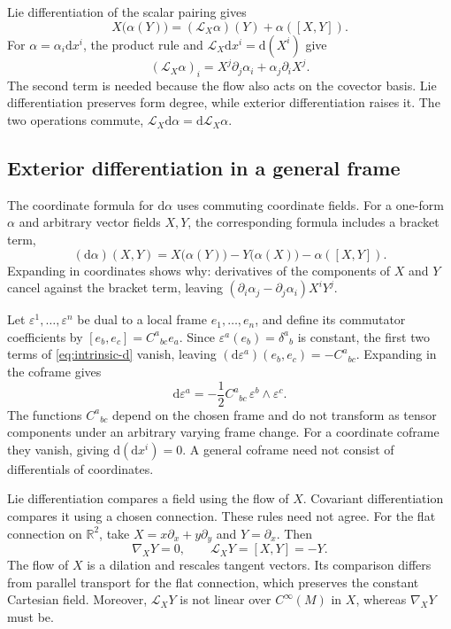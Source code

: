 \documentclass[11pt,a4paper]{article}
\numberwithin{equation}{section}
\newcommand{\R}{\mathbb R}
\newcommand{\dd}{\mathrm d}
\newcommand{\Cinf}{C^\infty}
\newcommand{\Lie}{\mathcal L}
\begin{document}
Lie differentiation of the scalar pairing gives
\[
 X\bigl(\alpha(Y)\bigr)=(\Lie_X\alpha)(Y)+\alpha([X,Y]).
\]
For \(\alpha=\alpha_i\dd x^i\), the product rule and
\(\Lie_X\dd x^i=\dd(X^i)\) give
\begin{equation}
 (\Lie_X\alpha)_i=X^j\partial_j\alpha_i+\alpha_j\partial_iX^j.
 \label{eq:lie-one-form}
\end{equation}
The second term is needed because the flow also acts on the covector
basis. Lie differentiation preserves form degree, while exterior
differentiation raises it. The two operations commute,
\(\Lie_X\dd\alpha=\dd\Lie_X\alpha\).

\subsection{Exterior differentiation in a general frame}

The coordinate formula for \(\dd\alpha\) uses commuting coordinate
fields. For a one-form \(\alpha\) and arbitrary vector fields \(X,Y\),
the corresponding formula includes a bracket term,
\begin{equation}
 (\dd\alpha)(X,Y)
 =X\bigl(\alpha(Y)\bigr)-Y\bigl(\alpha(X)\bigr)-\alpha([X,Y]).
 \label{eq:intrinsic-d}
\end{equation}
Expanding in coordinates shows why: derivatives of the components of
\(X\) and \(Y\) cancel against the bracket term, leaving
\((\partial_i\alpha_j-\partial_j\alpha_i)X^iY^j\).

Let \(\varepsilon^1,\ldots,\varepsilon^n\) be dual to a local frame
\(e_1,\ldots,e_n\), and define its commutator coefficients by
\([e_b,e_c]=C^a{}_{bc}e_a\). Since
\(\varepsilon^a(e_b)=\delta^a{}_b\) is constant, the first two
terms of \eqref{eq:intrinsic-d} vanish, leaving
\((\dd\varepsilon^a)(e_b,e_c)=-C^a{}_{bc}\). Expanding in the coframe
gives
\begin{equation}
 \dd\varepsilon^a=-\frac12 C^a{}_{bc}\,
                         \varepsilon^b\wedge\varepsilon^c.
 \label{eq:coframe-bracket}
\end{equation}
The functions \(C^a{}_{bc}\) depend on the chosen frame and do not
transform as tensor components under an arbitrary varying frame change.
For a coordinate coframe they vanish, giving \(\dd(\dd x^i)=0\).
A general coframe need not consist of differentials of coordinates.

\begin{remarkbox}
Lie differentiation compares a field using the flow of \(X\).
Covariant differentiation compares it using a chosen connection.
These rules need not agree. For the flat connection on \(\R^2\), take
\(X=x\partial_x+y\partial_y\) and \(Y=\partial_x\). Then
\[
 \nabla_XY=0,\qquad \Lie_XY=[X,Y]=-Y.
\]
The flow of \(X\) is a dilation and rescales tangent vectors. Its
comparison differs from parallel transport for the flat connection,
which preserves the constant Cartesian field. Moreover,
\(\Lie_XY\) is not linear over \(\Cinf(M)\) in \(X\), whereas
\(\nabla_XY\) must be.
\end{remarkbox}
\end{document}
